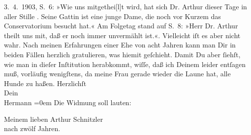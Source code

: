 \begin{ledgroupsized}[t]{13cm}
{{{                        3. 4. 1903, S. 6: »Wie uns
                        mitgethei{[}l{]}t wird, hat sich Dr. Arthur  dieser Tage in aller Stille . Seine Gattin ist eine junge Dame, die noch vor Kurzem das
                        Conservatorium besucht hat.« Am
                  Folgetag stand auf S. 8: »Herr Dr. Arthur  theilt uns mit, daß er noch immer
                     unvermählt ist.«}}}\label{K_L01286-1h}. Vielleicht iſt es aber nicht wahr. Nach meinen
               Erfahrungen einer Ehe von acht Jahren kann man Dir in beiden Fällen herzlich
               gratulieren, was hiemit geſchieht.\pend
           \pstart
           Damit Du aber ſiehſt, wie man in dieſer Inſtitution herabkommt, wiſſe, daß ich Deinem
                  \label{K_L01286-2v}\label{K_L01286-2h} leider entſagen muß, vorläufig wenigſtens, da meine Frau gerade wieder die Laune hat, alle
               Hunde zu haßen.\pend
           \pstart
           Herzlichſt{\\[\baselineskip]}Dein{\\[\baselineskip]}\spacefill\mbox{Hermann}\pend
           \leftskip=0em{}\pstart
           \noindent{}{\pb}Die Widmung soll lauten:\pend
           \begin{mdbar}\pstart
           \noindent{}\centering{}Meinem lieben Arthur Schnitzler{\\}nach zwölf Jahren.\pend
           \end{mdbar}
         
         \endnumbering{}\end{ledgroupsized}  \newcommand{\dateiname}{L01286}\newcommand{\titel}{Hermann Bahr an Arthur Schnitzler, 4. 4. [1903]}\newcommand{\editorInnen}{ Kurt Ifkovits,  Martin Anton Müller}
      